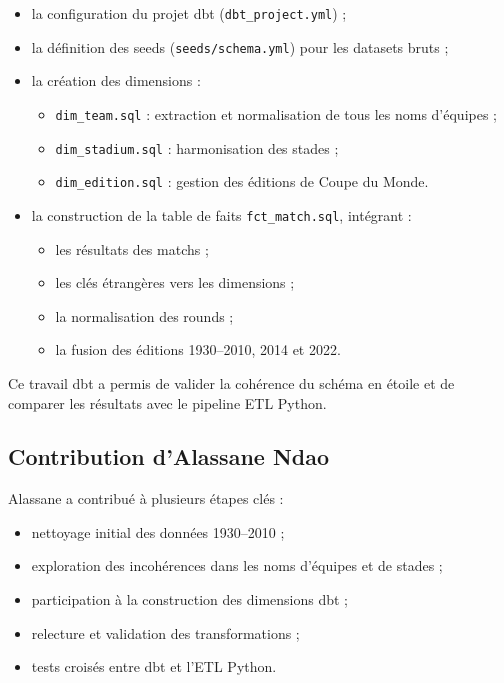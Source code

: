 \documentclass[12pt,a4paper]{article}
\begin{document}
\begin{itemize}
    \item la configuration du projet dbt (\texttt{dbt\_project.yml}) ;
    \item la définition des seeds (\texttt{seeds/schema.yml}) pour les datasets bruts ;
    \item la création des dimensions :
    \begin{itemize}
        \item \texttt{dim\_team.sql} : extraction et normalisation de tous les noms d’équipes ;
        \item \texttt{dim\_stadium.sql} : harmonisation des stades ;
        \item \texttt{dim\_edition.sql} : gestion des éditions de Coupe du Monde.
    \end{itemize}
    \item la construction de la table de faits \texttt{fct\_match.sql}, intégrant :
    \begin{itemize}
        \item les résultats des matchs ;
        \item les clés étrangères vers les dimensions ;
        \item la normalisation des rounds ;
        \item la fusion des éditions 1930--2010, 2014 et 2022.
    \end{itemize}
\end{itemize}

Ce travail dbt a permis de valider la cohérence du schéma en étoile et de comparer les résultats avec le pipeline ETL Python.

\subsection*{Contribution d'Alassane Ndao}

Alassane a contribué à plusieurs étapes clés :

\begin{itemize}
    \item nettoyage initial des données 1930--2010 ;
    \item exploration des incohérences dans les noms d’équipes et de stades ;
    \item participation à la construction des dimensions dbt ;
    \item relecture et validation des transformations ;
    \item tests croisés entre dbt et l’ETL Python.
\end{itemize}
\end{document}
